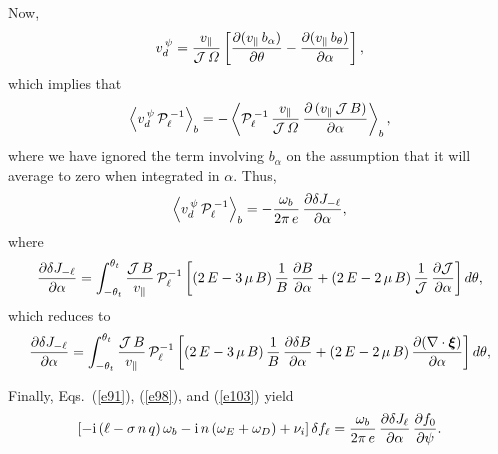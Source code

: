 \documentclass[12pt,prb,aps,notitlepage]{revtex4-1}
\newcommand{\bxi}{\mbox{\boldmath$\xi$}}
\begin{document}
 Now, 
 \begin{equation}\label{e101}
 v_d^{\,\psi}= \frac{v_\parallel}{{\cal J}\,{\mit\Omega}}\left[\frac{\partial (v_\parallel\,b_\alpha)}{\partial\theta} - \frac{\partial (v_\parallel\,b_\theta)}{\partial \alpha}\right],
 \end{equation}
 which implies that 
 \begin{equation}
 \left\langle v_d^{\,\psi}\,{\cal P}_{\ell}^{\,-1}\right\rangle_b = -\left\langle{\cal P}_{\ell}^{\,-1}\, \frac{v_\parallel}{{\cal J}\,{\mit\Omega}}\,\frac{\partial \,(v_\parallel\,{\cal J}\,B)}{\partial\alpha}\right\rangle_b,
 \end{equation}
 where we have ignored the term involving $b_\alpha$ on the assumption that it will average to zero when integrated in $\alpha$. 
 Thus,
 \begin{equation}\label{e103}
 \left\langle v_d^{\,\psi}\,{\cal P}_{\ell}^{\,-1}\right\rangle_b =-\frac{\omega_b}{2\pi\,e}\,\frac{\partial \delta J_{-\ell}}{\partial\alpha},
 \end{equation}
 where
 \begin{equation}
 \frac{\partial \delta J_{-\ell}}{\partial\alpha}= \int_{-\theta_t}^{\theta_t}
 \frac{{\cal J}\,B}{v_\parallel}\,{\cal P}_{\ell}^{-1}
 \left[(2\,E-3\,\mu\,B)\,\frac{1}{B}\,\frac{\partial B}{\partial \alpha} + (2\,E-2\,\mu\,B)\,\frac{1}{{\cal J}}\,\frac{\partial
 {\cal J}}{\partial\alpha}\right]d\theta,
 \end{equation}
 which reduces to 
 \begin{equation}
 \frac{\partial \delta J_{-\ell}}{\partial\alpha}= \int_{-\theta_t}^{\theta_t}
 \frac{{\cal J}\,B}{v_\parallel}\,{\cal P}_{\ell}^{-1}
 \left[(2\,E-3\,\mu\,B)\,\frac{1}{B}\,\frac{\partial \delta B}{\partial \alpha} + (2\,E-2\,\mu\,B)\,\frac{\partial
(\nabla\cdot\bxi)}{\partial\alpha}\right]d\theta,
 \end{equation}
 
 Finally, Eqs.~(\ref{e91}), (\ref{e98}), and (\ref{e103}) yield
 \begin{equation}
 \left[-{\rm i}\,(\ell - \sigma\,n\,q)\,\omega_b -{\rm i}\,n\,(\omega_E+\omega_D) + \nu_i\right]\delta f_\ell = \frac{\omega_b}{2\pi\,e}\,\frac{\partial \delta J_{\ell}}{\partial\alpha}\,\frac{\partial f_0}{\partial \psi}.
 \end{equation}
 
\end{document}
